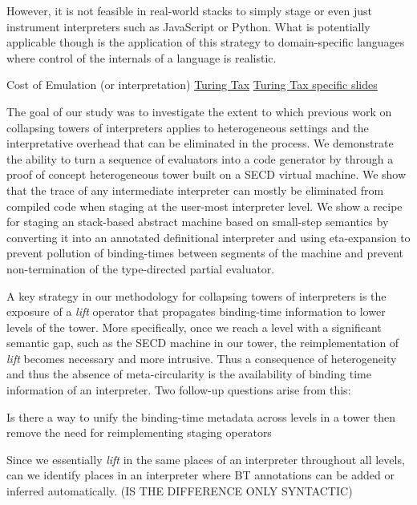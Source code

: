 \documentclass[fleqn]{article}
\theoremstyle{definition}
\begin{document}
However, it is not feasible in real-world stacks to simply stage or even just instrument interpreters such as JavaScript or Python. What is potentially applicable though is the application of this strategy to domain-specific languages where control of the internals of a language is realistic.

Cost of Emulation (or interpretation)
\cite{steil2004dynamic}
\href{http://materials.dagstuhl.de/files/17/17061/17061.PaulH.J.Kelly.Slides.pdf}{Turing Tax}
\href{https://www.doc.ic.ac.uk/~phjk/AdvancedCompArchitecture/Lectures/pdfs/Ch01-TuringTaxDiscussionV02.pdf}{Turing Tax specific slides}

The goal of our study was to investigate the extent to which previous work on collapsing towers of interpreters applies to heterogeneous settings and the interpretative overhead that can be eliminated in the process. We demonstrate the ability to turn a sequence of evaluators into a code generator by through a proof of concept heterogeneous tower built on a SECD virtual machine. We show that the trace of any intermediate interpreter can mostly be eliminated from compiled code when staging at the user-most interpreter level. We show a recipe for staging an stack-based abstract machine based on small-step semantics by converting it into an annotated definitional interpreter and using eta-expansion to prevent pollution of binding-times between segments of the machine and prevent non-termination of the type-directed partial evaluator.

A key strategy in our methodology for collapsing towers of interpreters is the exposure of a \textit{lift} operator that propagates binding-time information to lower levels of the tower. More specifically, once we reach a level with a significant semantic gap, such as the SECD machine in our tower, the reimplementation of \textit{lift} becomes necessary and more intrusive. Thus a consequence of heterogeneity and thus the absence of meta-circularity is the availability of binding time information of an interpreter. Two follow-up questions arise from this:
\begin{enumerate*}
	\item Is there a way to unify the binding-time metadata across levels in a tower then remove the need for reimplementing staging operators
	\item Since we essentially \textit{lift} in the same places of an interpreter throughout all levels, can we identify places in an interpreter where BT annotations can be added or inferred automatically. (IS THE DIFFERENCE ONLY SYNTACTIC)
\end{enumerate*}
\end{document}

